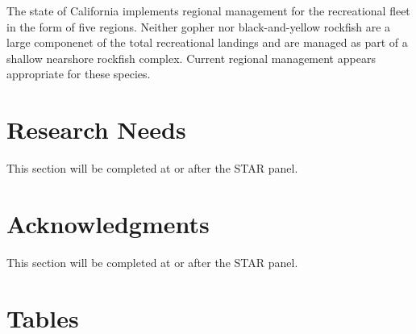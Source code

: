 \documentclass[12pt,]{article}
\begin{document}
The state of California implements regional management for the
recreational fleet in the form of five regions. Neither gopher nor
black-and-yellow rockfish are a large componenet of the total
recreational landings and are managed as part of a shallow nearshore
rockfish complex. Current regional management appears appropriate for
these species.

\section{Research Needs}\label{research-needs}

This section will be completed at or after the STAR panel.

\section{Acknowledgments}\label{acknowledgments}

This section will be completed at or after the STAR panel.

\newpage

\FloatBarrier

\section{Tables}\label{tables}

\FloatBarrier
\end{document}
